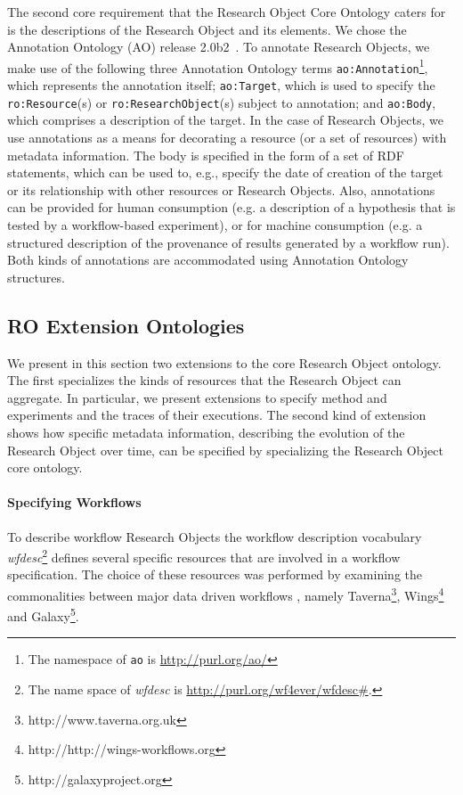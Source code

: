 The second core requirement that the Research Object Core Ontology caters for is the descriptions of the Research Object and its elements. We chose the Annotation Ontology (AO) release 2.0b2~\cite{COG11}. To annotate Research Objects, we make use of the following three Annotation Ontology terms \texttt{ao:Annotation}\footnote{The namespace of \texttt{ao} is \url{http://purl.org/ao/}}, which represents the annotation itself; \texttt{ao:Target}, which is used to specify the \texttt{ro:Resource}(s) or \texttt{ro:ResearchObject}(s) subject to annotation; and \texttt{ao:Body}, which comprises a description of the target.
In the case of Research Objects, we use annotations as a means for decorating a resource (or a set of resources) with metadata information. The body is specified in the form of a set of RDF statements, which can be used to, e.g., specify  the date of creation of the target or its relationship with other resources or Research Objects. Also, annotations can be provided for human consumption (e.g. a description of a hypothesis that is tested by a workflow-based experiment), or for machine consumption (e.g. a structured description of the provenance of results generated by a workflow run). Both kinds of annotations are accommodated using Annotation Ontology structures.

\subsection{RO Extension Ontologies}
We present in this section two  extensions to the core Research Object ontology. The first specializes the kinds of resources that the Research Object can aggregate. In particular, we present extensions to specify  method and experiments and the traces of their executions. The second kind of extension shows how specific metadata information, describing the evolution of the Research Object over time, can be specified by specializing the Research Object core ontology.

\paragraph{Specifying Workflows}
To describe workflow Research Objects the workflow description vocabulary \textit{wfdesc}\footnote{The name space of \textit{wfdesc} is \url{http://purl.org/wf4ever/wfdesc\#}.} defines several specific resources that are involved in a workflow specification. The choice of these resources was performed by examining the commonalities between major data driven workflows \cite{TDG+07}, namely Taverna\footnote{http://www.taverna.org.uk}, Wings\footnote{http://http://wings-workflows.org} and Galaxy\footnote{http://galaxyproject.org}.

